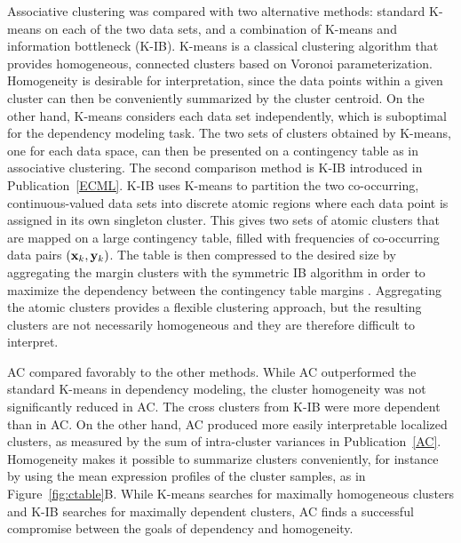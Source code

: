 Associative clustering was compared with two alternative methods:
standard K-means on each of the two data sets, and a combination of
K-means and information bottleneck (K-IB). K-means \citep[see
e.g.][]{Bishop06} is a classical clustering algorithm that provides
homogeneous, connected clusters based on Voronoi
parameterization. Homogeneity is desirable for interpretation, since
the data points within a given cluster can then be conveniently
summarized by the cluster centroid. On the other hand, K-means
considers each data set independently, which is suboptimal for the
dependency modeling task. The two sets of clusters obtained by
K-means, one for each data space, can then be presented on a
contingency table as in associative clustering.  The second comparison
method is K-IB introduced in Publication~\ref{ECML}. K-IB uses K-means
to partition the two co-occurring, continuous-valued data sets into
discrete atomic regions where each data point is assigned in its own
singleton cluster. This gives two sets of atomic clusters that are
mapped on a large contingency table, filled with frequencies of
co-occurring data pairs $(\mathbf{x}_k, \mathbf{y}_k)$. The table is then compressed
to the desired size by aggregating the margin clusters with the
symmetric IB algorithm in order to maximize the dependency between the
contingency table margins \citep{Friedman01}.  Aggregating the atomic
clusters provides a flexible clustering approach, but the resulting
clusters are not necessarily homogeneous and they are therefore
difficult to interpret.

AC compared favorably to the other methods.  While AC outperformed the
standard K-means in dependency modeling, the cluster homogeneity was
not significantly reduced in AC. The cross clusters from K-IB
\citep{Sinkkonen03tr} were more dependent than in AC. On the other
hand, AC produced more easily interpretable localized clusters, as
measured by the sum of intra-cluster variances in
Publication~\ref{AC}. Homogeneity makes it possible to summarize
clusters conveniently, for instance by using the mean expression
profiles of the cluster samples, as in Figure~\ref{fig:ctable}B.
While K-means searches for maximally homogeneous clusters and K-IB
searches for maximally dependent clusters, AC finds a successful
compromise between the goals of dependency and homogeneity.

